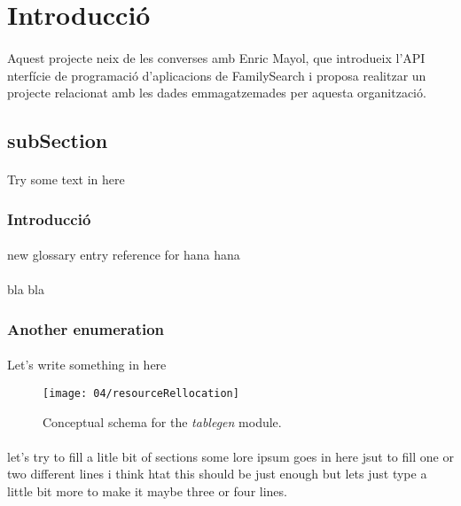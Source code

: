 \section{Introducció}
\paragraph{}
Aquest projecte neix de les converses amb Enric Mayol, que introdueix l'API nterfície de programació d'aplicacions de FamilySearch i proposa realitzar un projecte relacionat amb les dades emmagatzemades per aquesta organització.

\subsection{subSection}
\paragraph{}
Try some text in here

\subsubsection{Introducció}
\paragraph{}
new glossary entry reference for hana \gls{hana}

\paragraph{}
bla bla

\subsubsection{Another enumeration}
\paragraph{}
Let's write something in here

\begin{figure}
        \texttt{[image: 04/resourceRellocation]}
        \centering
        \caption{Conceptual schema for the \emph{tablegen} module.}
\end{figure}

\paragraph{}
let's try to fill a litle bit of sections some lore ipsum goes in here jsut to fill one or two different lines i think htat this should be just enough but lets just type a little bit more to make it maybe three or four lines.

